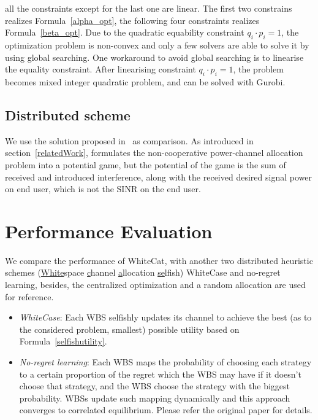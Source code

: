 		all the constraints except for the last one are linear.
The first two constrains realizes Formula~\ref{alpha_opt}, the following four constraints realizes Formula~\ref{beta_opt}.
Due to the quadratic equability constraint $q_i\cdot p_i =1$, the optimization problem is non-convex and only a few solvers are able to solve it by using global searching.
One workaround to avoid global searching is to linearise the equality constraint. 
After linearising constraint $q_i\cdot p_i =1$, the problem becomes mixed integer quadratic problem, and can be solved with Gurobi.

\subsection{Distributed scheme}
We use the solution proposed in~\cite{pimrc_2012} as comparison.
As introduced in section~\ref{relatedWork}, \cite{pimrc_2012} formulates the non-cooperative power-channel allocation problem into a potential game, but the potential of the game is the sum of received and introduced interference, along with the received desired signal power on end user, which is not the SINR on the end user.



\section{Performance Evaluation}
\label{simulation}
We compare the performance of WhiteCat, with another two distributed heuristic schemes (\underline{White}space \underline{c}hannel \underline{a}llocation \underline{se}lfish) WhiteCase and no-regret learning, besides, the centralized optimization and a random allocation are used for reference.

\begin{itemize}
\item \textit{WhiteCase}:  Each WBS selfishly updates its channel to achieve the best (as to the considered problem, smallest) possible utility based on Formula~\ref{selfishutility}.

\item \textit{No-regret learning}: Each WBS maps the probability of choosing each strategy to a certain proportion of the regret which the WBS may have if it doesn't choose that strategy, and the WBS choose the strategy with the biggest probability.  WBSs update such mapping dynamically and this approach converges to correlated equilibrium. 
Please refer the original paper \cite{hart00correlatedeq} for details.
		
\end{itemize}



